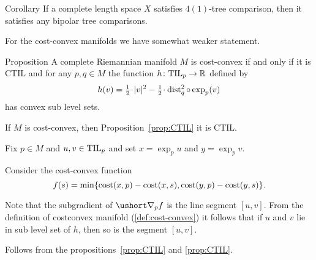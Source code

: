 \begin{thm}{Corollary}\label{cor:4(1)=>n(1)}
If a complete length space $X$ satisfies $4(1)$-tree comparison, then it satisfies any bipolar tree comparisons.
\end{thm}

For the cost-convex manifolds we have somewhat weaker statement.

\begin{thm}{Proposition}\label{prop:convexity}
A complete Riemannian manifold $M$ is cost-convex if and only if it is CTIL and
for any $p,q\in M$ the function $h\colon \mathrm{\rm TIL}_p\to \mathbb{R}$ defined by
\[h(v)=\tfrac12\cdot|v|^2-\tfrac12\cdot\dist_q^2\circ\exp_p(v)\] 
has convex sub level sets.
\end{thm}

If $M$ is cost-convex, then Proposition~\ref{prop:CTIL} it is CTIL.

Fix $p\in M$ and $u,v\in \mathrm{\rm TIL}_p$
and set $x=\exp_pu$ and $y=\exp_pv$.

Consider the cost-convex function 
\[f(s)=\min\{\text{\rm cost}(x,p)-\text{\rm cost}(x,s),\text{\rm cost}(y,p)-\text{\rm cost}(y,s)\}.\]

Note that the subgradient of $\ushort\nabla_pf$ is the line segment $[u,v]$.
From the definition of costconvex manifold (\ref{def:cost-convex}) it follows that if $u$ and $v$ lie in sub level set of $h$, then so is the segment $[u,v]$.

 Follows from the propositions~\ref{prop:CTIL} and \ref{prop:CTIL}.
\qeds
